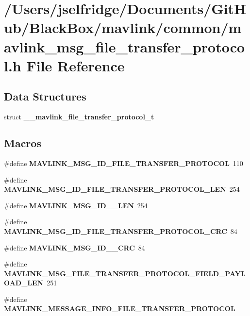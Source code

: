 \section{/\+Users/jselfridge/\+Documents/\+Git\+Hub/\+Black\+Box/mavlink/common/mavlink\+\_\+msg\+\_\+file\+\_\+transfer\+\_\+protocol.h File Reference}
\label{mavlink__msg__file__transfer__protocol_8h}
\subsection*{Data Structures}
\begin{DoxyCompactItemize}
\item 
struct \textbf{ \+\_\+\+\_\+mavlink\+\_\+file\+\_\+transfer\+\_\+protocol\+\_\+t}
\end{DoxyCompactItemize}
\subsection*{Macros}
\begin{DoxyCompactItemize}
\item 
\#define \textbf{ M\+A\+V\+L\+I\+N\+K\+\_\+\+M\+S\+G\+\_\+\+I\+D\+\_\+\+F\+I\+L\+E\+\_\+\+T\+R\+A\+N\+S\+F\+E\+R\+\_\+\+P\+R\+O\+T\+O\+C\+OL}~110
\item 
\#define \textbf{ M\+A\+V\+L\+I\+N\+K\+\_\+\+M\+S\+G\+\_\+\+I\+D\+\_\+\+F\+I\+L\+E\+\_\+\+T\+R\+A\+N\+S\+F\+E\+R\+\_\+\+P\+R\+O\+T\+O\+C\+O\+L\+\_\+\+L\+EN}~254
\item 
\#define \textbf{ M\+A\+V\+L\+I\+N\+K\+\_\+\+M\+S\+G\+\_\+\+I\+D\+\_\+\_\+\+L\+EN}~254
\item 
\#define \textbf{ M\+A\+V\+L\+I\+N\+K\+\_\+\+M\+S\+G\+\_\+\+I\+D\+\_\+\+F\+I\+L\+E\+\_\+\+T\+R\+A\+N\+S\+F\+E\+R\+\_\+\+P\+R\+O\+T\+O\+C\+O\+L\+\_\+\+C\+RC}~84
\item 
\#define \textbf{ M\+A\+V\+L\+I\+N\+K\+\_\+\+M\+S\+G\+\_\+\+I\+D\+\_\+\_\+\+C\+RC}~84
\item 
\#define \textbf{ M\+A\+V\+L\+I\+N\+K\+\_\+\+M\+S\+G\+\_\+\+F\+I\+L\+E\+\_\+\+T\+R\+A\+N\+S\+F\+E\+R\+\_\+\+P\+R\+O\+T\+O\+C\+O\+L\+\_\+\+F\+I\+E\+L\+D\+\_\+\+P\+A\+Y\+L\+O\+A\+D\+\_\+\+L\+EN}~251
\item 
\#define \textbf{ M\+A\+V\+L\+I\+N\+K\+\_\+\+M\+E\+S\+S\+A\+G\+E\+\_\+\+I\+N\+F\+O\+\_\+\+F\+I\+L\+E\+\_\+\+T\+R\+A\+N\+S\+F\+E\+R\+\_\+\+P\+R\+O\+T\+O\+C\+OL}
\end{DoxyCompactItemize}
